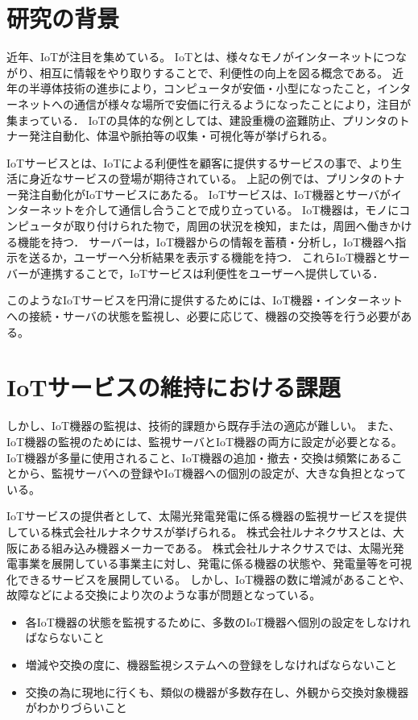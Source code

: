 \section{研究の背景}
近年、IoTが注目を集めている。
IoTとは、様々なモノがインターネットにつながり、相互に情報をやり取りすることで、利便性の向上を図る概念である。
近年の半導体技術の進歩により，コンピュータが安価・小型になったこと，インターネットへの通信が様々な場所で安価に行えるようになったことにより，注目が集まっている．
IoTの具体的な例としては、建設重機の盗難防止、プリンタのトナー発注自動化、体温や脈拍等の収集・可視化等が挙げられる。
\medskip

IoTサービスとは、IoTによる利便性を顧客に提供するサービスの事で、より生活に身近なサービスの登場が期待されている。
上記の例では、プリンタのトナー発注自動化がIoTサービスにあたる。
IoTサービスは、IoT機器とサーバがインターネットを介して通信し合うことで成り立っている。
IoT機器は，モノにコンピュータが取り付けられた物で，周囲の状況を検知，または，周囲へ働きかける機能を持つ．
サーバーは，IoT機器からの情報を蓄積・分析し，IoT機器へ指示を送るか，ユーザーへ分析結果を表示する機能を持つ．
これらIoT機器とサーバーが連携することで，IoTサービスは利便性をユーザーへ提供している．
\medskip

このようなIoTサービスを円滑に提供するためには、IoT機器・インターネットへの接続・サーバの状態を監視し、必要に応じて、機器の交換等を行う必要がある。


\section{IoTサービスの維持における課題}
しかし、IoT機器の監視は、技術的課題から既存手法の適応が難しい。
また、IoT機器の監視のためには、監視サーバとIoT機器の両方に設定が必要となる。
IoT機器が多量に使用されること、IoT機器の追加・撤去・交換は頻繁にあることから、監視サーバへの登録やIoT機器への個別の設定が、大きな負担となっている。


IoTサービスの提供者として、太陽光発電発電に係る機器の監視サービスを提供している株式会社ルナネクサスが挙げられる。
株式会社ルナネクサスとは、大阪にある組み込み機器メーカーである。
株式会社ルナネクサスでは、太陽光発電事業を展開している事業主に対し、発電に係る機器の状態や、発電量等を可視化できるサービスを展開している。
しかし、IoT機器の数に増減があることや、故障などによる交換により次のような事が問題となっている。
\begin{itemize}
\item 各IoT機器の状態を監視するために、多数のIoT機器へ個別の設定をしなければならないこと
\item 増減や交換の度に、機器監視システムへの登録をしなければならないこと
\item 交換の為に現地に行くも、類似の機器が多数存在し、外観から交換対象機器がわかりづらいこと
\end{itemize}


